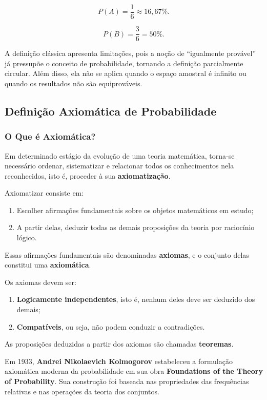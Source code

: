 \[
P(A)= \frac{1}{6} \approx 16,67\%.
\]

\[
P(B)= \frac{3}{6} = 50\%.
\]

A definição clássica apresenta limitações, pois a noção de ``igualmente provável'' já pressupõe o conceito de probabilidade, tornando a definição parcialmente circular. Além disso, ela não se aplica quando o espaço amostral é infinito ou quando os resultados não são equiprováveis.


\subsection{Definição Axiomática de Probabilidade}
\subsubsection{O Que é Axiomática?}

Em determinado estágio da evolução de uma teoria matemática, torna-se necessário ordenar, sistematizar e relacionar todos os conhecimentos nela reconhecidos, isto é, proceder à sua \textbf{axiomatização}.\vskip0.3cm
 
Axiomatizar consiste em:

\begin{enumerate}
\item Escolher afirmações fundamentais sobre os objetos matemáticos em estudo;
\item A partir delas, deduzir todas as demais proposições da teoria por raciocínio lógico.
\end{enumerate} 

Essas afirmações fundamentais são denominadas \textbf{axiomas}, e o conjunto delas constitui uma \textbf{axiomática}.\vskip0.3cm
 

Os axiomas devem ser:

\begin{enumerate}
    \item \textbf{Logicamente independentes}, isto é, nenhum deles deve ser deduzido dos demais;
    \item \textbf{Compatíveis}, ou seja, não podem conduzir a contradições.
\end{enumerate}
 
As proposições deduzidas a partir dos axiomas são chamadas \textbf{teoremas}.\vskip0.3cm

Em 1933, \textbf{Andrei Nikolaevich Kolmogorov} estabeleceu a formulação axiomática moderna da probabilidade em sua obra \textbf{Foundations of the Theory of Probability}. Sua construção foi baseada nas propriedades das frequências relativas e nas operações da teoria dos conjuntos.

